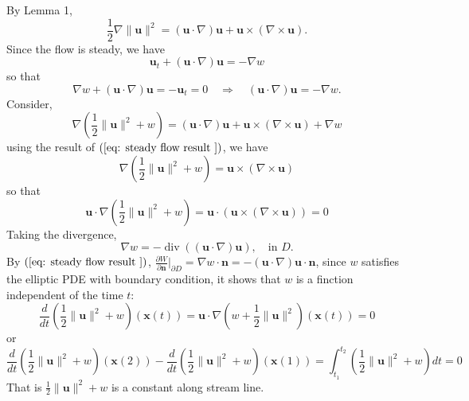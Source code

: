 By Lemma 1,
\begin{equation}
\frac{1}{2}\nabla\lVert\textbf{u}\rVert^2 = \left(\textbf{u}\cdot \nabla\right)\textbf{u} + \textbf{u}\times\left(\nabla\times\textbf{u}\right).
\end{equation}
Since the flow is steady, we have
\begin{equation}
\textbf{u}_t + \left(\textbf{u}\cdot \nabla\right) \textbf{u} = -\nabla w
\end{equation}
so that 
\begin{equation}
\nabla w + \left(\textbf{u}\cdot \nabla\right) \textbf{u} = -\textbf{u}_t = 0
\quad\Rightarrow\quad
\left(\textbf{u}\cdot \nabla\right) \textbf{u} = - \nabla w.
\label{eq: steady flow result }
\end{equation}
Consider, 
\begin{equation}
\nabla\left(\frac{1}{2}\lVert\textbf{u}\rVert^2 + w\right) = \left(\textbf{u}\cdot \nabla\right)\textbf{u} + \textbf{u}\times\left(\nabla\times\textbf{u}\right) + \nabla w
\end{equation}
using the result of  $(\ref{eq: steady flow result })$, we have 
\begin{equation}
\nabla\left(\frac{1}{2}\lVert\textbf{u}\rVert^2 + w\right) = \textbf{u}\times\left(\nabla\times\textbf{u}\right)
\end{equation}
so that 
\begin{equation}
\textbf{u}\cdot\nabla\left(\frac{1}{2}\lVert\textbf{u}\rVert^2 + w\right) = \textbf{u}\cdot\left(\textbf{u}\times\left(\nabla\times\textbf{u}\right)\right) = 0
\end{equation}
Taking the divergence, 
\begin{equation}
\nabla w = -\operatorname{div}\left((\textbf{u}\cdot\nabla)\textbf{u}\right),\quad \text{in $D$.}
\end{equation}
By $(\ref{eq: steady flow result })$, $\displaystyle \frac{\partial W}{\partial \textbf{n}}\Bigg|_{\partial D} = \nabla w\cdot \textbf{n} = - (\textbf{u}\cdot\nabla)\textbf{u}\cdot \textbf{n}$, since $w$ satisfies the elliptic PDE with boundary condition, it shows that $w$ is a finction independent of the time $t$:
\begin{equation}
\frac{d}{dt}\left(\frac{1}{2}\lVert\textbf{u}\rVert^2+w\right)(\textbf{x}(t))
=\textbf{u} \cdot \nabla \left(w + \frac{1}{2}\lVert\textbf{u}\rVert^2\right)(\textbf{x}(t))
= 0
\end{equation}
or 
\begin{equation}
\frac{d}{dt}\left(\frac{1}{2}\lVert\textbf{u}\rVert^2+w\right)(\textbf{x}(2)) - \frac{d}{dt}\left(\frac{1}{2}\lVert\textbf{u}\rVert^2+w\right)(\textbf{x}(1)) = \int_{t_1}^{t_2} \left(\frac{1}{2}\lVert\textbf{u}\rVert^2+w\right)dt = 0
\end{equation}
 That is $\displaystyle \frac{1}{2}\lVert\textbf{u}\rVert^2+w$ is a constant along stream line.

